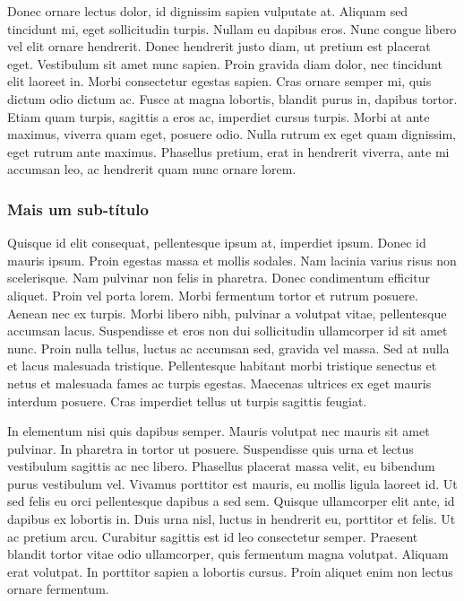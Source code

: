 Donec ornare lectus dolor, id dignissim sapien vulputate at. Aliquam sed tincidunt mi, eget sollicitudin turpis. Nullam eu dapibus eros. Nunc congue libero vel elit ornare hendrerit. Donec hendrerit justo diam, ut pretium est placerat eget. Vestibulum sit amet nunc sapien. Proin gravida diam dolor, nec tincidunt elit laoreet in. Morbi consectetur egestas sapien. Cras ornare semper mi, quis dictum odio dictum ac. Fusce at magna lobortis, blandit purus in, dapibus tortor. Etiam quam turpis, sagittis a eros ac, imperdiet cursus turpis. Morbi at ante maximus, viverra quam eget, posuere odio. Nulla rutrum ex eget quam dignissim, eget rutrum ante maximus. Phasellus pretium, erat in hendrerit viverra, ante mi accumsan leo, ac hendrerit quam nunc ornare lorem.

\subsubsection{Mais um sub-título}

Quisque id elit consequat, pellentesque ipsum at, imperdiet ipsum. Donec id mauris ipsum. Proin egestas massa et mollis sodales. Nam lacinia varius risus non scelerisque. Nam pulvinar non felis in pharetra. Donec condimentum efficitur aliquet. Proin vel porta lorem. Morbi fermentum tortor et rutrum posuere. Aenean nec ex turpis. Morbi libero nibh, pulvinar a volutpat vitae, pellentesque accumsan lacus. Suspendisse et eros non dui sollicitudin ullamcorper id sit amet nunc. Proin nulla tellus, luctus ac accumsan sed, gravida vel massa. Sed at nulla et lacus malesuada tristique. Pellentesque habitant morbi tristique senectus et netus et malesuada fames ac turpis egestas. Maecenas ultrices ex eget mauris interdum posuere. Cras imperdiet tellus ut turpis sagittis feugiat.

In elementum nisi quis dapibus semper. Mauris volutpat nec mauris sit amet pulvinar. In pharetra in tortor ut posuere. Suspendisse quis urna et lectus vestibulum sagittis ac nec libero. Phasellus placerat massa velit, eu bibendum purus vestibulum vel. Vivamus porttitor est mauris, eu mollis ligula laoreet id. Ut sed felis eu orci pellentesque dapibus a sed sem. Quisque ullamcorper elit ante, id dapibus ex lobortis in. Duis urna nisl, luctus in hendrerit eu, porttitor et felis. Ut ac pretium arcu. Curabitur sagittis est id leo consectetur semper. Praesent blandit tortor vitae odio ullamcorper, quis fermentum magna volutpat. Aliquam erat volutpat. In porttitor sapien a lobortis cursus. Proin aliquet enim non lectus ornare fermentum.

